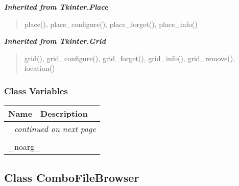 \large{\textbf{\textit{Inherited from Tkinter.Place}}}

\begin{quote}
place(), place\_configure(), place\_forget(), place\_info()
\end{quote}

\large{\textbf{\textit{Inherited from Tkinter.Grid}}}

\begin{quote}
grid(), grid\_configure(), grid\_forget(), grid\_info(), grid\_remove(), location()
\end{quote}


  \subsubsection{Class Variables}

    \vspace{-1cm}
\hspace{\varindent}\begin{longtable}{|p{\varnamewidth}|p{\vardescrwidth}|l}
\cline{1-2}
\cline{1-2} \centering \textbf{Name} & \centering \textbf{Description}& \\
\cline{1-2}
\endhead\cline{1-2}\multicolumn{3}{r}{\small\textit{continued on next page}}\\\endfoot\cline{1-2}
\endlastfoot\multicolumn{2}{|l|}{\textit{Inherited from Tkinter.Misc}}\\
\multicolumn{2}{|p{\varwidth}|}{\raggedright \_noarg\_}\\
\cline{1-2}
\end{longtable}



\subsection{Class ComboFileBrowser}

